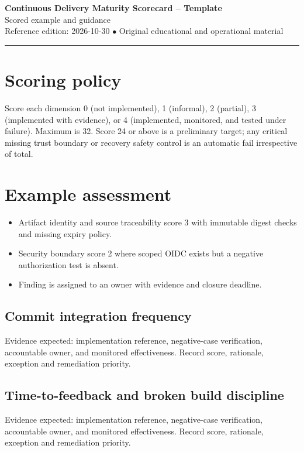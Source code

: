 \documentclass[10pt,letterpaper]{article}
\begin{document}
\begin{center}
{\LARGE\bfseries\color{cdblue}Continuous Delivery Maturity Scorecard -- Template}\\[7pt]
{\large Scored example and guidance}\\[6pt]
{\small Reference edition: 2026-10-30 $\bullet$ Original educational and operational material}
\end{center}
\noindent\color{cdblue}\rule{\linewidth}{1.2pt}\color{black}
\vspace{0.4em}
\section{Scoring policy}
Score each dimension 0 (not implemented), 1 (informal), 2 (partial), 3 (implemented with evidence), or 4 (implemented, monitored, and tested under failure). Maximum is 32. Score 24 or above is a preliminary target; any critical missing trust boundary or recovery safety control is an automatic fail irrespective of total.


\section{Example assessment}
\begin{itemize}
\item Artifact identity and source traceability score 3 with immutable digest checks and missing expiry policy.
\item Security boundary score 2 where scoped OIDC exists but a negative authorization test is absent.
\item Finding is assigned to an owner with evidence and closure deadline.
\end{itemize}

\subsection{Commit integration frequency}
Evidence expected: implementation reference, negative-case verification, accountable owner, and monitored effectiveness. Record score, rationale, exception and remediation priority.


\subsection{Time-to-feedback and broken build discipline}
Evidence expected: implementation reference, negative-case verification, accountable owner, and monitored effectiveness. Record score, rationale, exception and remediation priority.
\end{document}

